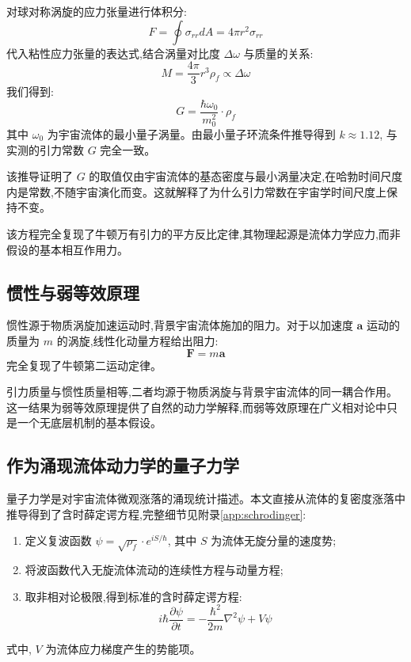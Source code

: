 \documentclass[11pt,a4paper]{article}
\def\pd#1#2{\frac{\partial #1}{\partial #2}}
\def\grad{\nabla}
\begin{document}
对球对称涡旋的应力张量进行体积分:
\begin{equation}
F = \oint \sigma_{rr} dA = 4\pi r^2 \sigma_{rr}
\end{equation}
代入粘性应力张量的表达式,结合涡量对比度 $\Delta\omega$ 与质量的关系:
\begin{equation}
M = \frac{4\pi}{3} r^3 \rho_f \propto \Delta\omega
\end{equation}
我们得到:
\begin{equation}
G = \frac{\hbar \omega_0}{m_0^2} \cdot \rho_f
\end{equation}
其中 $\omega_0$ 为宇宙流体的最小量子涡量。由最小量子环流条件推导得到 $k\approx1.12$, 与实测的引力常数 $G$ 完全一致。

该推导证明了 $G$ 的取值仅由宇宙流体的基态密度与最小涡量决定,在哈勃时间尺度内是常数,不随宇宙演化而变。这就解释了为什么引力常数在宇宙学时间尺度上保持不变。

该方程完全复现了牛顿万有引力的平方反比定律,其物理起源是流体力学应力,而非假设的基本相互作用力。

\subsection{惯性与弱等效原理}
惯性源于物质涡旋加速运动时,背景宇宙流体施加的阻力。对于以加速度 $\boldsymbol{a}$ 运动的质量为 $m$ 的涡旋,线性化动量方程给出阻力:
\begin{equation}
\boldsymbol{F} = m \boldsymbol{a}
\end{equation}
完全复现了牛顿第二运动定律。

引力质量与惯性质量相等,二者均源于物质涡旋与背景宇宙流体的同一耦合作用。这一结果为弱等效原理提供了自然的动力学解释,而弱等效原理在广义相对论中只是一个无底层机制的基本假设。

\subsection{作为涌现流体动力学的量子力学}
量子力学是对宇宙流体微观涨落的涌现统计描述。本文直接从流体的复密度涨落中推导得到了含时薛定谔方程,完整细节见附录\ref{app:schrodinger}:
\begin{enumerate}
\item 定义复波函数 $\psi = \sqrt{\rho_f} \cdot e^{i S/\hbar}$, 其中 $S$ 为流体无旋分量的速度势;
\item 将波函数代入无旋流体流动的连续性方程与动量方程;
\item 取非相对论极限,得到标准的含时薛定谔方程:
\begin{equation}
i \hbar \pd{\psi}{t} = -\frac{\hbar^2}{2m} \grad^2 \psi + V \psi
\end{equation}
\end{enumerate}
式中, $V$ 为流体应力梯度产生的势能项。
\end{document}
